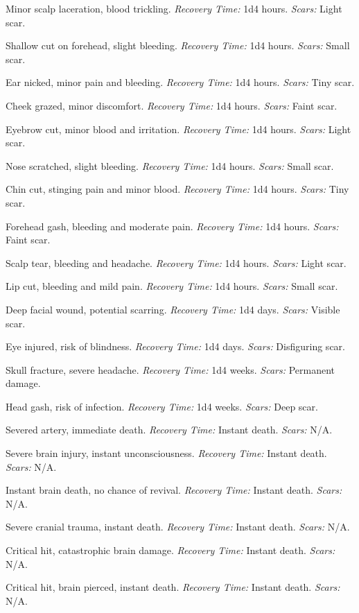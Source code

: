\documentclass[12pt]{book}
\begin{document}
\begin{description}[labelwidth=1.5em, leftmargin=*, itemsep=0.3em]
    \item[01 -] Minor scalp laceration, blood trickling. \textit{Recovery Time:} 1d4 hours. \textit{Scars:} Light scar.
    \item[02 -] Shallow cut on forehead, slight bleeding. \textit{Recovery Time:} 1d4 hours. \textit{Scars:} Small scar.
    \item[03 -] Ear nicked, minor pain and bleeding. \textit{Recovery Time:} 1d4 hours. \textit{Scars:} Tiny scar.
    \item[04 -] Cheek grazed, minor discomfort. \textit{Recovery Time:} 1d4 hours. \textit{Scars:} Faint scar.
    \item[05 -] Eyebrow cut, minor blood and irritation. \textit{Recovery Time:} 1d4 hours. \textit{Scars:} Light scar.
    \item[06 -] Nose scratched, slight bleeding. \textit{Recovery Time:} 1d4 hours. \textit{Scars:} Small scar.
    \item[07 -] Chin cut, stinging pain and minor blood. \textit{Recovery Time:} 1d4 hours. \textit{Scars:} Tiny scar.
    \item[08 -] Forehead gash, bleeding and moderate pain. \textit{Recovery Time:} 1d4 hours. \textit{Scars:} Faint scar.
    \item[09 -] Scalp tear, bleeding and headache. \textit{Recovery Time:} 1d4 hours. \textit{Scars:} Light scar.
    \item[10 -] Lip cut, bleeding and mild pain. \textit{Recovery Time:} 1d4 hours. \textit{Scars:} Small scar.
    \item[11 -] Deep facial wound, potential scarring. \textit{Recovery Time:} 1d4 days. \textit{Scars:} Visible scar.
    \item[12 -] Eye injured, risk of blindness. \textit{Recovery Time:} 1d4 days. \textit{Scars:} Disfiguring scar.
    \item[13 -] Skull fracture, severe headache. \textit{Recovery Time:} 1d4 weeks. \textit{Scars:} Permanent damage.
    \item[14 -] Head gash, risk of infection. \textit{Recovery Time:} 1d4 weeks. \textit{Scars:} Deep scar.
    \item[15 -] Severed artery, immediate death. \textit{Recovery Time:} Instant death. \textit{Scars:} N/A.
    \item[16 -] Severe brain injury, instant unconsciousness. \textit{Recovery Time:} Instant death. \textit{Scars:} N/A.
    \item[17 -] Instant brain death, no chance of revival. \textit{Recovery Time:} Instant death. \textit{Scars:} N/A.
    \item[18 -] Severe cranial trauma, instant death. \textit{Recovery Time:} Instant death. \textit{Scars:} N/A.
    \item[19 -] Critical hit, catastrophic brain damage. \textit{Recovery Time:} Instant death. \textit{Scars:} N/A.
    \item[20 -] Critical hit, brain pierced, instant death. \textit{Recovery Time:} Instant death. \textit{Scars:} N/A.
\end{description}
\end{document}
